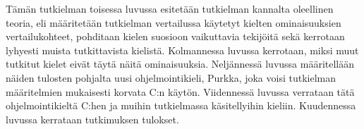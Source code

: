 %


Tämän tutkielman toisessa luvussa esitetään tutkielman kannalta oleellinen
teoria, eli määritetään tutkielman vertailussa käytetyt kielten ominaisuuksien
vertailukohteet, pohditaan kielen suosioon vaikuttavia tekijöitä sekä kerrotaan
lyhyesti muista tutkittavista kielistä. Kolmannessa luvussa kerrotaan, miksi
muut tutkitut kielet eivät täytä näitä ominaisuuksia. Neljännessä luvussa
määritellään näiden tulosten pohjalta uusi ohjelmointikieli, Purkka, joka voisi
tutkielman määritelmien mukaisesti korvata C:n käytön. Viidennessä luvussa
verrataan tätä ohjelmointikieltä C:hen ja muihin tutkielmassa käsitellyihin
kieliin. Kuudennessa luvussa kerrataan tutkimuksen tulokset.

